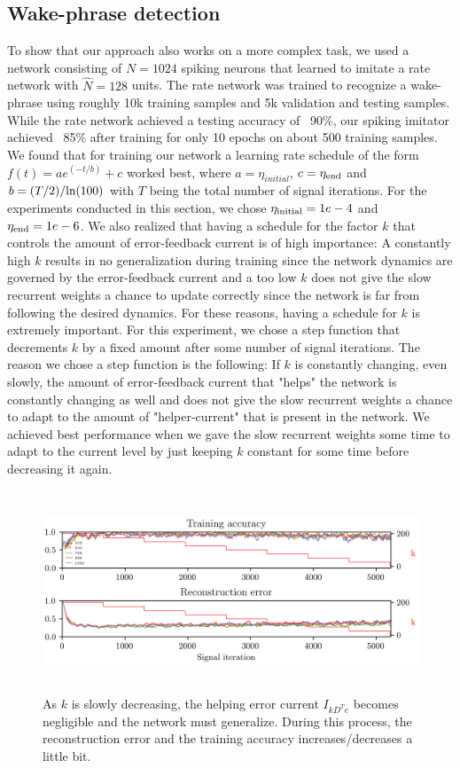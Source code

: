 \documentclass[twoside,11pt,titlepage]{article}
\begin{document}
\subsection{Wake-phrase detection}
To show that our approach also works on a more complex task, we used a network consisting of $N=1024$ spiking
neurons that learned to imitate a rate network with $\hat{N}=128$ units. The rate network was trained to recognize
a wake-phrase using roughly 10k training samples and 5k validation and testing samples. While the rate network
achieved a testing accuracy of ~90\%, our spiking imitator achieved ~85\% after training for only 10 epochs on about 500
training samples. We found that for training our network a learning rate schedule of the form $f(t)=a e^{(-t/b)}+c$
worked best, where $a=\eta_{initial}$, $c=\eta_\textnormal{end}$ and $b = (T/2) / \textnormal{ln}(100)$ with $T$ being the
total number of signal iterations. For the experiments conducted in this section, we chose $\eta_\textnormal{initial}=1e-4$ and $\eta_\textnormal{end}=1e-6$.
We also realized that having a schedule for the factor $k$ that controls the amount of error-feedback current is of high importance:
A constantly high $k$ results in no generalization during training since the network dynamics are governed by the error-feedback current and a too low
$k$ does not give the slow recurrent weights a chance to update correctly since the network is far from following the desired dynamics.
For these reasons, having a schedule for $k$ is extremely important. For this experiment, we chose a step function that decrements $k$ by a fixed amount
after some number of signal iterations. The reason we chose a step function is the following: 
If $k$ is constantly changing, even slowly, the amount of error-feedback current that "helps" the network
is constantly changing as well and does not give the slow recurrent weights a chance to adapt to the amount of "helper-current" that is
present in the network. We achieved best performance when we gave the slow recurrent weights some time to adapt to the current level by just
keeping $k$ constant for some time before decreasing it again.

\begin{figure}[!htb]
  \includegraphics[width = \columnwidth, height=6cm]{figures/figure6.png}
  \caption{As $k$ is slowly decreasing, the helping error current $I_{kD^Te}$ becomes negligible and the network must generalize. During this process, the
  reconstruction error and the training accuracy increases/decreases a little bit. }
  \label{fig:figure6}
\end{figure}
\end{document}
